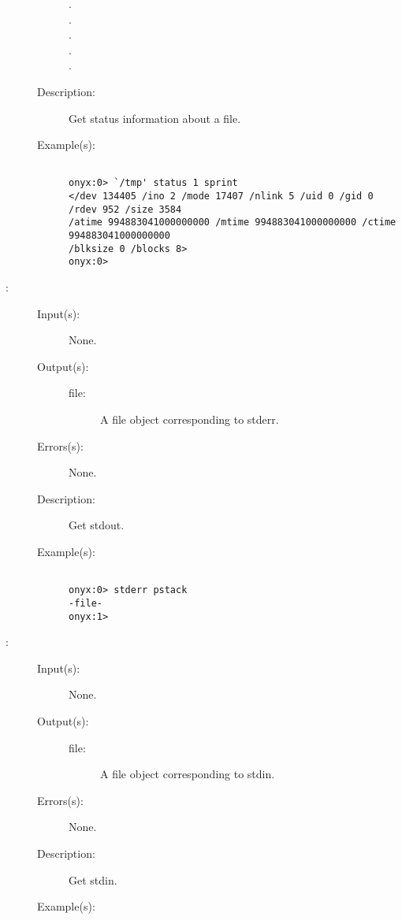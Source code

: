 \begin{description}
\begin{description}
\begin{description}
		\item[.]
		\item[.]
		\item[.]
		\item[.]
		\item[.]
		\end{description}
	\item[Description: ]
		Get status information about a file.
	\item[Example(s): ]\begin{verbatim}

onyx:0> `/tmp' status 1 sprint
</dev 134405 /ino 2 /mode 17407 /nlink 5 /uid 0 /gid 0 /rdev 952 /size 3584
/atime 994883041000000000 /mtime 994883041000000000 /ctime 994883041000000000
/blksize 0 /blocks 8>
onyx:0>
		\end{verbatim}
	\end{description}
\label{systemdict:stderr}
\item[{\onyxop{--}{stderr}{file}}: ]
	\begin{description}\item[]
	\item[Input(s): ] None.
	\item[Output(s): ]
		\begin{description}\item[]
		\item[file: ]
			A file object corresponding to stderr.
		\end{description}
	\item[Errors(s): ] None.
	\item[Description: ]
		Get stdout.
	\item[Example(s): ]\begin{verbatim}

onyx:0> stderr pstack
-file-
onyx:1>
		\end{verbatim}
	\end{description}
\label{systemdict:stdin}
\item[{\onyxop{--}{stdin}{file}}: ]
	\begin{description}\item[]
	\item[Input(s): ] None.
	\item[Output(s): ]
		\begin{description}\item[]
		\item[file: ]
			A file object corresponding to stdin.
		\end{description}
	\item[Errors(s): ] None.
	\item[Description: ]
		Get stdin.
	\item[Example(s): ]\begin{verbatim}


\end{verbatim}
\end{description}
\end{description}
